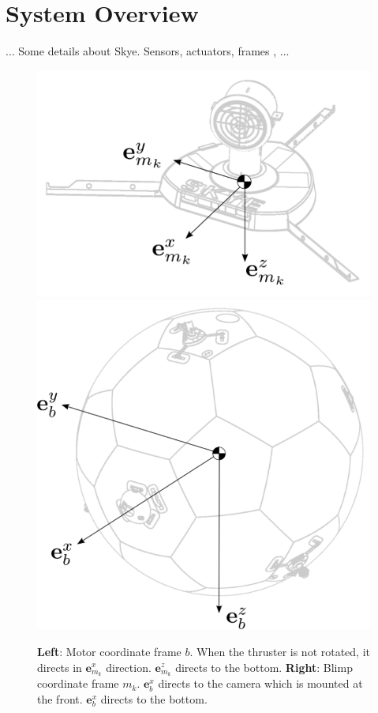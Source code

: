 \section{System Overview}
... Some details about Skye. Sensors, actuators, frames \cite{Schaffner2012}, ... \cite{Skye2013}
\\


\begin{figure}[hbtp]
\label{fig:frames}
\centering
\includegraphics[width=.4\linewidth]{images/motor_frame.png}
\includegraphics[width=.4\linewidth]{images/blimp_frame.png}
\caption{\textbf{Left}: Motor coordinate frame $b$. When the thruster is not rotated, it directs in $\mathbf{e}^x_{m_k}$ direction. $\mathbf{e}^z_{m_k}$ directs to the bottom. \textbf{Right}: Blimp coordinate frame $m_k$. $\mathbf{e}^x_{b}$ directs to the camera which is mounted at the front. $\mathbf{e}^x_{b}$ directs to the bottom.}
\end{figure}
